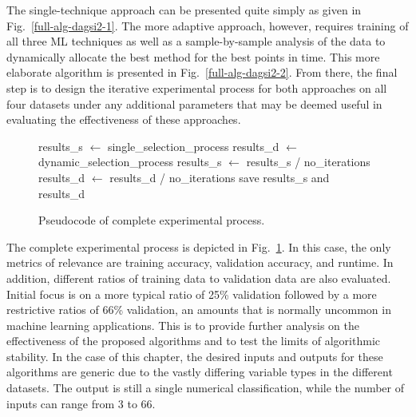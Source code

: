 \documentclass[12pt]{uthesis-v12}  %
\begin{document}
The single-technique approach can be presented quite simply as given in Fig.~\ref{full-alg-dagsi2-1}. The more adaptive approach, however, requires training of all three ML techniques as well as a sample-by-sample analysis of the data to dynamically allocate the best method for the best points in time. This more elaborate algorithm is presented in Fig.~\ref{full-alg-dagsi2-2}. From there, the final step is to design the iterative experimental process for both approaches on all four datasets under any additional parameters that may be deemed useful in evaluating the effectiveness of these approaches.
\begin{figure}
\begin{algorithmic}[1]
				\STATE results\_s $\leftarrow$ single\_selection\_process
				\STATE results\_d $\leftarrow$ dynamic\_selection\_process
			\ENDFOR
				\STATE results\_s $\leftarrow$ results\_s / no\_iterations
				\STATE results\_d $\leftarrow$ results\_d / no\_iterations
				\STATE save results\_s and results\_d
			\ENDFOR	
		\ENDFOR
	\ENDFOR
\ENDFOR
\label{full-alg-dagsi2-3}
\end{algorithmic}
\caption{Pseudocode of complete experimental process.} 
\label{full-alg-dagsi2-3}
\end{figure}	
The complete experimental process is depicted in Fig.~\ref{full-alg-dagsi2-3}. In this case, the only metrics of relevance are training accuracy, validation accuracy, and runtime. In addition, different ratios of training data to validation data are also evaluated. Initial focus is on a more typical ratio of 25\% validation followed by a more restrictive ratios of 66\% validation, an amounts that is normally uncommon in machine learning applications. This is to provide further analysis on the effectiveness of the proposed algorithms and to test the limits of algorithmic stability.
In the case of this chapter, the desired inputs and outputs for these algorithms are generic due to the vastly differing variable types in the different datasets. The output is still a single numerical classification, while the number of inputs can range from 3 to 66. 
\end{document}
